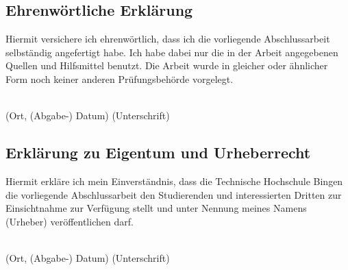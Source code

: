 \thispagestyle{empty}

\subsection*{Ehrenwörtliche Erklärung}

\vspace*{20pt}
Hiermit versichere ich ehrenwörtlich, dass ich die vorliegende Abschlussarbeit selbständig angefertigt habe. Ich habe dabei nur die in der Arbeit angegebenen Quellen und Hilfsmittel benutzt.
Die Arbeit wurde in gleicher oder ähnlicher Form noch keiner anderen Prüfungsbehörde vorgelegt.

\vspace*{20pt}
\noindent
\dotfill \hspace{2cm} \dotfill \\
\vspace*{20pt}
(Ort, (Abgabe-) Datum) \hfill (Unterschrift)

\vspace*{100pt}

\subsection*{Erklärung zu Eigentum und Urheberrecht}

Hiermit erkläre ich mein Einverständnis, dass die Technische Hochschule Bingen die vorliegende
Abschlussarbeit den Studierenden und interessierten Dritten zur Einsichtnahme zur Verfügung
stellt und unter Nennung meines Namens (Urheber) veröffentlichen darf.

\vspace*{20pt}
\noindent
\dotfill \hspace{2cm} \dotfill \\
\vspace*{20pt}
(Ort, (Abgabe-) Datum) \hfill (Unterschrift)



